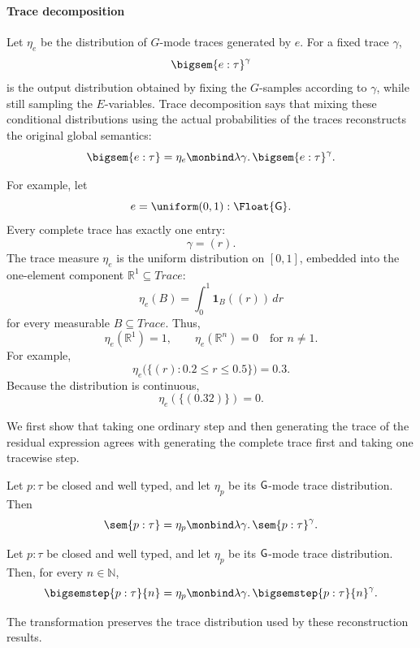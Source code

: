 \paragraph{Trace decomposition}
Let \(\eta_e\) be the distribution of \(G\)-mode traces generated by \(e\). For a fixed trace \(\gamma\),
\[
\bigsem{e:\tau}^{\gamma}
\]
is the output distribution obtained by fixing the \(G\)-samples according to
\(\gamma\), while still sampling the \(E\)-variables.
Trace decomposition says that mixing these conditional distributions using the actual probabilities of the traces reconstructs the original global semantics:
\[
\bigsem{e:\tau}
=
\eta_e
\monbind
\lambda\gamma.\,
\bigsem{e:\tau}^{\gamma}.
\]

For example, let
\[
e=\uniform(0,1):\Float{\G}.
\]
Every complete trace has exactly one entry:
\[
\gamma=(r).
\]
The trace measure \(\eta_e\) is the uniform distribution on \([0,1]\),
embedded into the one-element component \(\mathbb R^1\subseteq Trace\):
\[
\eta_e(B)
=
\int_0^1 \mathbf 1_B((r))\,dr
\]
for every measurable \(B\subseteq Trace\). Thus,
\[
\eta_e(\mathbb R^1)=1,
\qquad
\eta_e(\mathbb R^n)=0
\quad\text{for }n\neq1.
\]
For example,
\[
\eta_e\bigl(\{(r):0.2\leq r\leq0.5\}\bigr)=0.3.
\]
Because the distribution is continuous,
\[
\eta_e(\{(0.32)\})=0.
\]

We first show that taking one ordinary step and then generating the trace
of the residual expression agrees with generating the complete trace
first and taking one tracewise step.


\begin{lemma}
  \label{lem:one-step-trace-reconstruction}
  Let $p:\tau$ be closed and well typed, and let $\eta_p$ be its
  $\mathsf{G}$-mode trace distribution. Then
  \[
    \sem{p:\tau}
    =
    \eta_p
    \monbind
    \lambda\gamma.\,
    \sem{p:\tau}^{\gamma}.
  \]
\end{lemma}


\begin{lemma}
  \label{lem:finite-step-trace-reconstruction}
  Let $p:\tau$ be closed and well typed, and let $\eta_p$ be its
  $\mathsf{G}$-mode trace distribution. Then, for every $n\in\mathbb N$,
  \[
    \bigsemstep{p:\tau}{n}
    =
    \eta_p
    \monbind
    \lambda\gamma.\,
    \bigsemstep{p:\tau}{n}^{\gamma}.
  \]
\end{lemma}


The transformation preserves the trace distribution used by these
reconstruction results.

